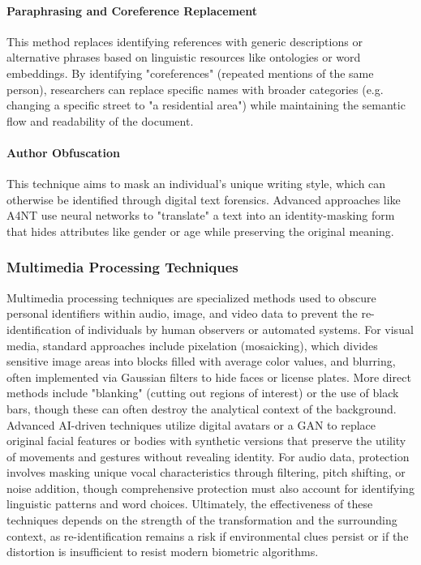 \paragraph{Paraphrasing and Coreference Replacement}
This method replaces identifying references with generic descriptions or alternative phrases based on linguistic resources like ontologies or word embeddings. By identifying "coreferences" (repeated mentions of the same person), researchers can replace specific names with broader categories (e.g. changing a specific street to "a residential area") while maintaining the semantic flow and readability of the document.
\autocite[107--112]{Krebs2022}

\paragraph{Author Obfuscation}
This technique aims to mask an individual's unique writing style, which can otherwise be identified through digital text forensics. Advanced approaches like \ac{A4NT} use neural networks to "translate" a text into an identity-masking form that hides attributes like gender or age while preserving the original meaning.
\autocite[110--112]{Krebs2022}

\subsubsection{Multimedia Processing Techniques}

Multimedia processing techniques are specialized methods used to obscure personal identifiers within audio, image, and video data to prevent the re-identification of individuals by human observers or automated systems. For visual media, standard approaches include pixelation (mosaicking), which divides sensitive image areas into blocks filled with average color values, and blurring, often implemented via Gaussian filters to hide faces or license plates. More direct methods include "blanking" (cutting out regions of interest) or the use of black bars, though these can often destroy the analytical context of the background. Advanced AI-driven techniques utilize digital avatars or a \ac{GAN} to replace original facial features or bodies with synthetic versions that preserve the utility of movements and gestures without revealing identity. For audio data, protection involves masking unique vocal characteristics through filtering, pitch shifting, or noise addition, though comprehensive protection must also account for identifying linguistic patterns and word choices. Ultimately, the effectiveness of these techniques depends on the strength of the transformation and the surrounding context, as re-identification remains a risk if environmental clues persist or if the distortion is insufficient to resist modern biometric algorithms.
\autocite[112--117]{Krebs2022}
\autocite[64--65]{gmdsbvd2024praxishilfe}

